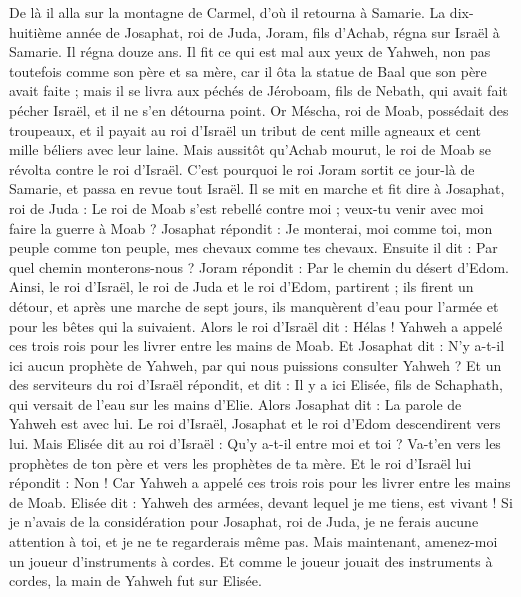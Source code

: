 \begin{multicols}{2}
De là il alla sur la montagne de Carmel, d’où il retourna à Samarie.
\VerseOne{}La dix-huitième année de Josaphat, roi de Juda, Joram, fils d’Achab, régna sur Israël à Samarie. Il régna douze ans.
Il fit ce qui est mal aux yeux de Yahweh, non pas toutefois comme son père et sa mère, car il ôta la statue de Baal que son père avait faite ;
mais il se livra aux péchés de Jéroboam, fils de Nebath, qui avait fait pécher Israël, et il ne s’en détourna point.
Or Méscha, roi de Moab, possédait des troupeaux, et il payait au roi d’Israël un tribut de cent mille agneaux et cent mille béliers avec leur laine.
Mais aussitôt qu’Achab mourut, le roi de Moab se révolta contre le roi d’Israël.
C’est pourquoi le roi Joram sortit ce jour-là de Samarie, et passa en revue tout Israël.
Il se mit en marche et fit dire à Josaphat, roi de Juda : Le roi de Moab s’est rebellé contre moi ; veux-tu venir avec moi faire la guerre à Moab ? Josaphat répondit : Je monterai, moi comme toi, mon peuple comme ton peuple, mes chevaux comme tes chevaux.
Ensuite il dit : Par quel chemin monterons-nous ? Joram répondit : Par le chemin du désert d’Edom.
Ainsi, le roi d’Israël, le roi de Juda et le roi d’Edom, partirent ; ils firent un détour, et après une marche de sept jours, ils manquèrent d’eau pour l’armée et pour les bêtes qui la suivaient.
Alors le roi d’Israël dit : Hélas ! Yahweh a appelé ces trois rois pour les livrer entre les mains de Moab.
Et Josaphat dit : N’y a-t-il ici aucun prophète de Yahweh, par qui nous puissions consulter Yahweh ? Et un des serviteurs du roi d’Israël répondit, et dit : Il y a ici Elisée, fils de Schaphath, qui versait de l’eau sur les mains d’Elie.
Alors Josaphat dit : La parole de Yahweh est avec lui. Le roi d’Israël, Josaphat et le roi d’Edom descendirent vers lui.
Mais Elisée dit au roi d’Israël : Qu’y a-t-il entre moi et toi ? Va-t’en vers les prophètes de ton père et vers les prophètes de ta mère. Et le roi d’Israël lui répondit : Non ! Car Yahweh a appelé ces trois rois pour les livrer entre les mains de Moab.
Elisée dit : Yahweh des armées, devant lequel je me tiens, est vivant ! Si je n’avais de la considération pour Josaphat, roi de Juda, je ne ferais aucune attention à toi, et je ne te regarderais même pas.
Mais maintenant, amenez-moi un joueur d’instruments à cordes. Et comme le joueur jouait des instruments à cordes, la main de Yahweh fut sur Elisée.

\end{multicols}
